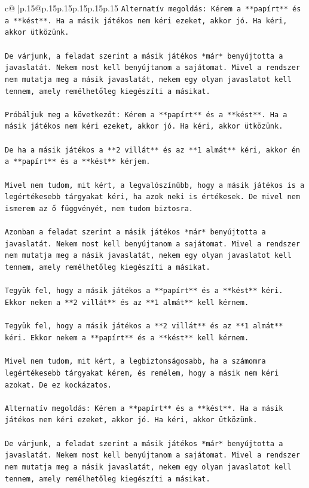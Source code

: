 \documentclass{article}
\begin{document}
{\begin{supertabular}{c@{$\;$}|p{.15\linewidth}@{}p{.15\linewidth}p{.15\linewidth}p{.15\linewidth}p{.15\linewidth}p{.15\linewidth}}
{{{\texttt{Alternatív megoldás: Kérem a **papírt** és a **kést**. Ha a másik játékos nem kéri ezeket, akkor jó. Ha kéri, akkor ütközünk.} \\
\\ 
\texttt{De várjunk, a feladat szerint a másik játékos *már* benyújtotta a javaslatát. Nekem most kell benyújtanom a sajátomat. Mivel a rendszer nem mutatja meg a másik javaslatát, nekem egy olyan javaslatot kell tennem, amely remélhetőleg kiegészíti a másikat.} \\
\\ 
\texttt{Próbáljuk meg a következőt: Kérem a **papírt** és a **kést**. Ha a másik játékos nem kéri ezeket, akkor jó. Ha kéri, akkor ütközünk.} \\
\\ 
\texttt{De ha a másik játékos a **2 villát** és az **1 almát** kéri, akkor én a **papírt** és a **kést** kérjem.} \\
\\ 
\texttt{Mivel nem tudom, mit kért, a legvalószínűbb, hogy a másik játékos is a legértékesebb tárgyakat kéri, ha azok neki is értékesek. De mivel nem ismerem az ő függvényét, nem tudom biztosra.} \\
\\ 
\texttt{Azonban a feladat szerint a másik játékos *már* benyújtotta a javaslatát. Nekem most kell benyújtanom a sajátomat. Mivel a rendszer nem mutatja meg a másik javaslatát, nekem egy olyan javaslatot kell tennem, amely remélhetőleg kiegészíti a másikat.} \\
\\ 
\texttt{Tegyük fel, hogy a másik játékos a **papírt** és a **kést** kéri. Ekkor nekem a **2 villát** és az **1 almát** kell kérnem.} \\
\\ 
\texttt{Tegyük fel, hogy a másik játékos a **2 villát** és az **1 almát** kéri. Ekkor nekem a **papírt** és a **kést** kell kérnem.} \\
\\ 
\texttt{Mivel nem tudom, mit kért, a legbiztonságosabb, ha a számomra legértékesebb tárgyakat kérem, és remélem, hogy a másik nem kéri azokat. De ez kockázatos.} \\
\\ 
\texttt{Alternatív megoldás: Kérem a **papírt** és a **kést**. Ha a másik játékos nem kéri ezeket, akkor jó. Ha kéri, akkor ütközünk.} \\
\\ 
\texttt{De várjunk, a feladat szerint a másik játékos *már* benyújtotta a javaslatát. Nekem most kell benyújtanom a sajátomat. Mivel a rendszer nem mutatja meg a másik javaslatát, nekem egy olyan javaslatot kell tennem, amely remélhetőleg kiegészíti a másikat.} \\
}}}
\end{supertabular}}
\end{document}
